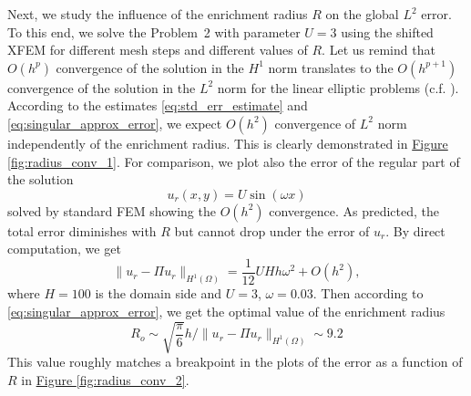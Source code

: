 \documentclass{elsarticle}
\newcommand{\prob}[1]{Problem~{#1}}
\newcommand{\fig}[1]{\hyperref[#1]{Figure \ref{#1}}}
\def\norm#1{\| #1 \|}
\begin{document}
Next, we study the influence of the enrichment radius $R$ on the global $L^2$ error. To this end, we solve the \prob{2} with parameter $U=3$
using the shifted XFEM for different mesh steps and different values of $R$.
Let us remind that $O(h^p)$ convergence of the solution in the $H^1$ norm translates to the $O(h^{p+1})$ convergence of the solution in the $L^2$ norm 
for the linear elliptic problems (c.f. \cite[Theorem 19.2]{ciarlet_basic_1991}). According to the estimates \eqref{eq:std_err_estimate}
and \eqref{eq:singular_approx_error}, we expect $O(h^2)$ convergence of $L^2$ norm independently of the enrichment radius. This is 
clearly demonstrated in \fig{fig:radius_conv_1}. For comparison, we plot also the error of the regular part of the solution
\[
  u_r(x,y) = U \sin (\omega x)
\]
solved by standard FEM showing the $O(h^2)$ convergence.
As predicted, the total error diminishes with $R$ but cannot 
drop under the error of $u_r$. By direct computation, we get
\[
  \norm{u_r - \Pi u_r}_{H^1(\Omega)} = \frac{1}{12}UHh\omega^2 + O(h^2),
\]
where $H=100$ is the domain side and $U=3$, $\omega=0.03$. Then according to \eqref{eq:singular_approx_error},
we get the optimal value of the enrichment radius
\[
    R_o \sim \sqrt{\frac{\pi}{6}} h/\norm{u_r - \Pi u_r}_{H^1(\Omega)} \sim 9.2
\]
This value roughly matches a breakpoint in the plots of the error as a function of $R$ in
\fig{fig:radius_conv_2}.
\end{document}

